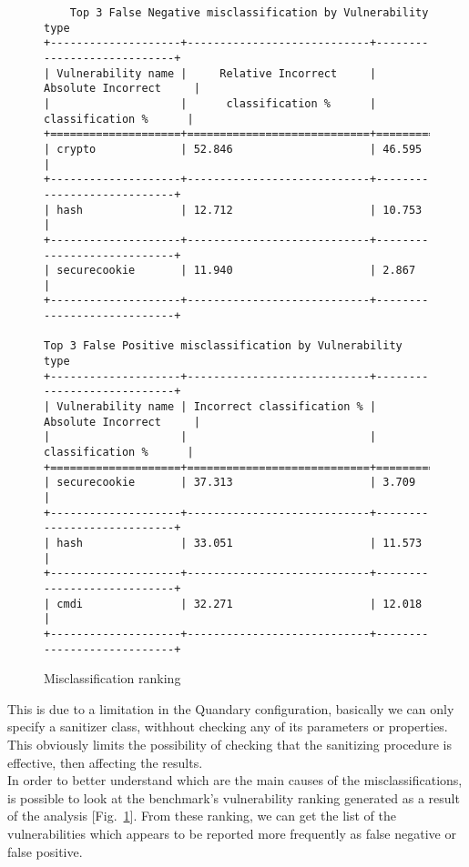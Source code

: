 \documentclass[../Report.tex]{subfiles}
\begin{document}
\begin{figure}
	\begin{center}
		\footnotesize{\begin{verbatim}
	Top 3 False Negative misclassification by Vulnerability type
+--------------------+----------------------------+----------------------------+
| Vulnerability name |     Relative Incorrect     |     Absolute Incorrect     |
|                    |      classification %      |      classification %      |
+====================+============================+============================+
| crypto             | 52.846                     | 46.595                     |
+--------------------+----------------------------+----------------------------+
| hash               | 12.712                     | 10.753                     |
+--------------------+----------------------------+----------------------------+
| securecookie       | 11.940                     | 2.867                      |
+--------------------+----------------------------+----------------------------+

Top 3 False Positive misclassification by Vulnerability type
+--------------------+----------------------------+----------------------------+
| Vulnerability name | Incorrect classification % |     Absolute Incorrect     |
|                    |                            |      classification %      |
+====================+============================+============================+
| securecookie       | 37.313                     | 3.709                      |
+--------------------+----------------------------+----------------------------+
| hash               | 33.051                     | 11.573                     |
+--------------------+----------------------------+----------------------------+
| cmdi               | 32.271                     | 12.018                     |
+--------------------+----------------------------+----------------------------+
			\end{verbatim}
		}
	\end{center}
	\caption{Misclassification ranking}
	\label{img:ranking}
\end{figure}
This is due to a limitation in the Quandary configuration, basically we can only specify a sanitizer class, withhout checking any of its parameters or properties. This obviously limits the possibility of checking that the sanitizing procedure is effective, then affecting the results. \\
In order to better understand which are the main causes of the misclassifications, is possible to look at the benchmark's vulnerability ranking generated as a result of the analysis [Fig.~\ref{img:ranking}]. From these ranking, we can get the list of the vulnerabilities which appears to be reported more frequently as false negative or false positive. 
\end{document}
